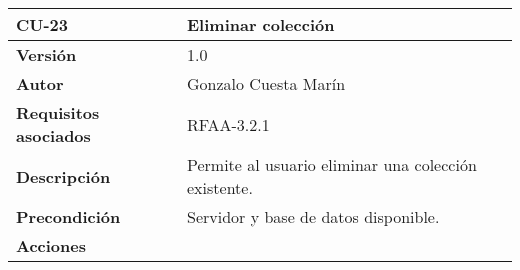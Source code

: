 \begin{longtable}[]{@{}ll@{}}
\toprule
\begin{minipage}[b]{0.19\columnwidth}\raggedright
\textbf{CU-23}\strut
\end{minipage} & \begin{minipage}[b]{0.75\columnwidth}\raggedright
\textbf{Eliminar colección}\strut
\end{minipage}\tabularnewline
\midrule
\endhead
\begin{minipage}[t]{0.19\columnwidth}\raggedright
\textbf{Versión}\strut
\end{minipage} & \begin{minipage}[t]{0.75\columnwidth}\raggedright
1.0\strut
\end{minipage}\tabularnewline
\begin{minipage}[t]{0.19\columnwidth}\raggedright
\textbf{Autor}\strut
\end{minipage} & \begin{minipage}[t]{0.75\columnwidth}\raggedright
Gonzalo Cuesta Marín\strut
\end{minipage}\tabularnewline
\begin{minipage}[t]{0.19\columnwidth}\raggedright
\textbf{Requisitos asociados}\strut
\end{minipage} & \begin{minipage}[t]{0.75\columnwidth}\raggedright
RFAA-3.2.1\strut
\end{minipage}\tabularnewline
\begin{minipage}[t]{0.19\columnwidth}\raggedright
\textbf{Descripción}\strut
\end{minipage} & \begin{minipage}[t]{0.75\columnwidth}\raggedright
Permite al usuario eliminar una colección existente.\strut
\end{minipage}\tabularnewline
\begin{minipage}[t]{0.19\columnwidth}\raggedright
\textbf{Precondición}\strut
\end{minipage} & \begin{minipage}[t]{0.75\columnwidth}\raggedright
Servidor y base de datos disponible.\strut
\end{minipage}\tabularnewline
\begin{minipage}[t]{0.19\columnwidth}\raggedright
\textbf{Acciones}\strut
\end{minipage} & \begin{minipage}[t]{0.75\columnwidth}\raggedright
\begin{enumerate}

\end{enumerate}
\end{minipage}
\end{longtable}
